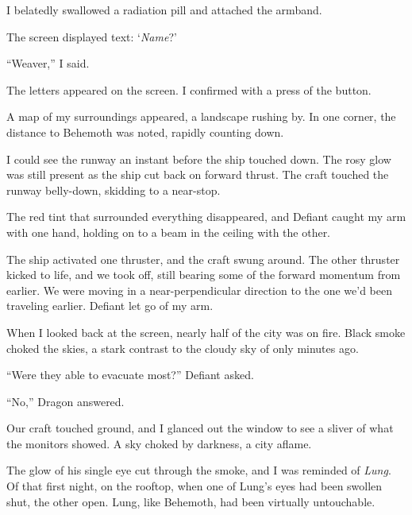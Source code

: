 I belatedly swallowed a radiation pill and attached the armband.



The screen displayed text:  `\emph{Name}?'



``Weaver,'' I said.



The letters appeared on the screen.  I confirmed with a press of the button.



A map of my surroundings appeared, a landscape rushing by.  In one corner, the distance to Behemoth was noted, rapidly counting down.



I could see the runway an instant before the ship touched down.  The rosy glow was still present as the ship cut back on forward thrust.  The craft touched the runway belly-down, skidding to a near-stop.



The red tint that surrounded everything disappeared, and Defiant caught my arm with one hand, holding on to a beam in the ceiling with the other.



The ship activated one thruster, and the craft swung around.  The other thruster kicked to life, and we took off, still bearing some of the forward momentum from earlier.  We were moving in a near-perpendicular direction to the one we'd been traveling earlier.  Defiant let go of my arm.



When I looked back at the screen, nearly half of the city was on fire.  Black smoke choked the skies, a stark contrast to the cloudy sky of only minutes ago.



``Were they able to evacuate most?'' Defiant asked.



``No,'' Dragon answered.



Our craft touched ground, and I glanced out the window to see a sliver of what the monitors showed.  A sky choked by darkness, a city aflame.



The glow of his single eye cut through the smoke, and I was reminded of \emph{Lung}.  Of that first night, on the rooftop, when one of Lung's eyes had been swollen shut, the other open.  Lung, like Behemoth, had been virtually untouchable.



